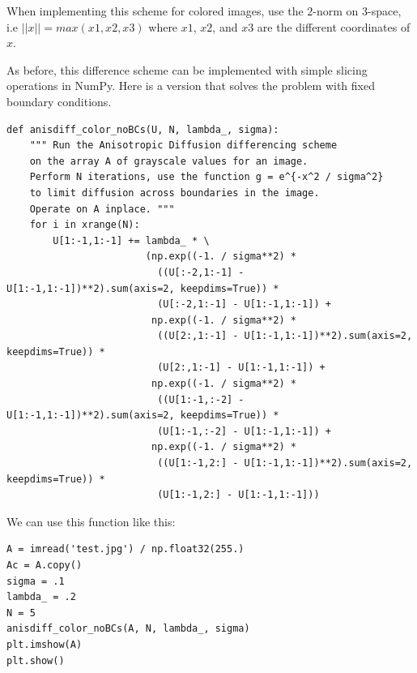 When implementing this scheme for colored images, use the $2$-norm on 3-space, i.e $||x||=max(x1,x2,x3)$ where $x1$, $x2$, and $x3$ are the different coordinates of $x$.

As before, this difference scheme can be implemented with simple slicing operations in NumPy.
Here is a version that solves the problem with fixed boundary conditions.
\begin{lstlisting}
def anisdiff_color_noBCs(U, N, lambda_, sigma):
    """ Run the Anisotropic Diffusion differencing scheme
    on the array A of grayscale values for an image.
    Perform N iterations, use the function g = e^{-x^2 / sigma^2}
    to limit diffusion across boundaries in the image.
    Operate on A inplace. """
    for i in xrange(N):
        U[1:-1,1:-1] += lambda_ * \
                        (np.exp((-1. / sigma**2) *
                          ((U[:-2,1:-1] - U[1:-1,1:-1])**2).sum(axis=2, keepdims=True)) *
                          (U[:-2,1:-1] - U[1:-1,1:-1]) +
                         np.exp((-1. / sigma**2) *
                          ((U[2:,1:-1] - U[1:-1,1:-1])**2).sum(axis=2, keepdims=True)) *
                          (U[2:,1:-1] - U[1:-1,1:-1]) +
                         np.exp((-1. / sigma**2) *
                          ((U[1:-1,:-2] - U[1:-1,1:-1])**2).sum(axis=2, keepdims=True)) *
                          (U[1:-1,:-2] - U[1:-1,1:-1]) +
                         np.exp((-1. / sigma**2) *
                          ((U[1:-1,2:] - U[1:-1,1:-1])**2).sum(axis=2, keepdims=True)) *
                          (U[1:-1,2:] - U[1:-1,1:-1]))
\end{lstlisting}
We can use this function like this:
\begin{lstlisting}
A = imread('test.jpg') / np.float32(255.)
Ac = A.copy()
sigma = .1
lambda_ = .2
N = 5
anisdiff_color_noBCs(A, N, lambda_, sigma)
plt.imshow(A)
plt.show()
\end{lstlisting}

